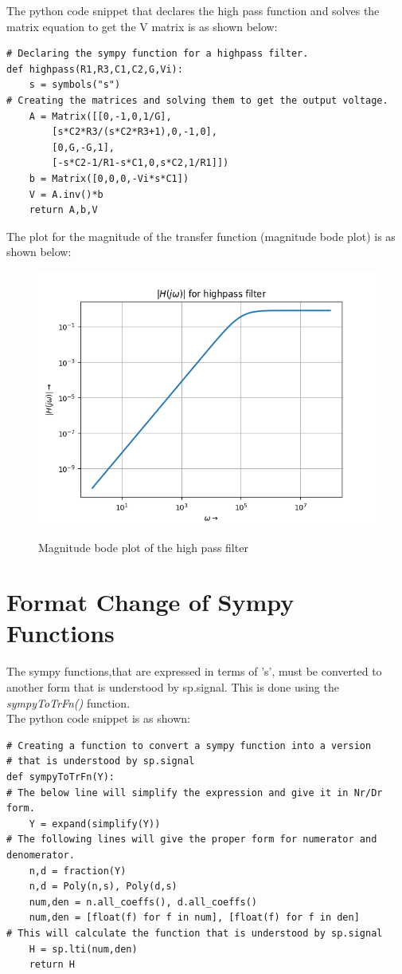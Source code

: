 \documentclass[11pt, a4paper]{article}
\begin{document}
The python code snippet that declares the high pass function and solves the matrix equation to get the V matrix is as shown below:

\begin{verbatim}
# Declaring the sympy function for a highpass filter.
def highpass(R1,R3,C1,C2,G,Vi):
    s = symbols("s")
# Creating the matrices and solving them to get the output voltage.	
    A = Matrix([[0,-1,0,1/G],
        [s*C2*R3/(s*C2*R3+1),0,-1,0],
        [0,G,-G,1],
        [-s*C2-1/R1-s*C1,0,s*C2,1/R1]])
    b = Matrix([0,0,0,-Vi*s*C1])
    V = A.inv()*b
    return A,b,V
\end{verbatim}
The plot for the magnitude of the transfer function (magnitude bode plot) is as shown below:
\begin{figure}[!tbh]
   	\centering
   	\includegraphics[scale=0.6]{Figure_3.png}
   	\label{fig:32}
   	\caption{Magnitude bode plot of the high pass filter}
   \end{figure}
\section*{Format Change of Sympy Functions}
The sympy functions,that are expressed in terms of 's', must be converted to another form that is understood by sp.signal. This is done using the \textit{sympyToTrFn()} function.\\
The python code snippet is as shown:
\begin{verbatim}
# Creating a function to convert a sympy function into a version 
# that is understood by sp.signal  	 
def sympyToTrFn(Y):
# The below line will simplify the expression and give it in Nr/Dr form.	
    Y = expand(simplify(Y))
# The following lines will give the proper form for numerator and denomerator.    
    n,d = fraction(Y)
    n,d = Poly(n,s), Poly(d,s)
    num,den = n.all_coeffs(), d.all_coeffs()
    num,den = [float(f) for f in num], [float(f) for f in den]
# This will calculate the function that is understood by sp.signal    
    H = sp.lti(num,den)
    return H
\end{verbatim}
\end{document}
